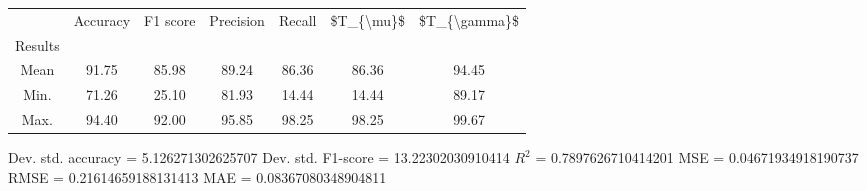 \begin{tabular}{|c|c|c|c|c|c|c|}
\toprule
{} &  Accuracy &  F1 score &  Precision &  Recall &  \$T\_\{\textbackslash mu\}\$ &  \$T\_\{\textbackslash gamma\}\$ \\
Results &           &           &            &         &            &               \\
\hline
Mean    &     91.75 &     85.98 &      89.24 &   86.36 &      86.36 &         94.45 \\
Min.    &     71.26 &     25.10 &      81.93 &   14.44 &      14.44 &         89.17 \\
Max.    &     94.40 &     92.00 &      95.85 &   98.25 &      98.25 &         99.67 \\
\bottomrule
\end{tabular}

 Dev. std. accuracy = 5.126271302625707
 Dev. std. F1-score = 13.22302030910414
 $R^2$ = 0.7897626710414201
 MSE = 0.04671934918190737
 RMSE = 0.21614659188131413
 MAE = 0.08367080348904811
